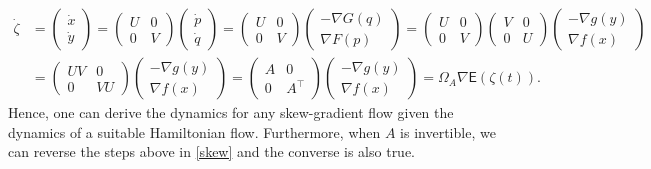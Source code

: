 \documentclass[11pt]{article}
\begin{document}
\begin{subequations}\label{skew}
\begin{align}
    \dot \zeta &=\begin{pmatrix} \dot x \\ \dot y \end{pmatrix}=\begin{pmatrix} U & 0 \\ 0 & V \end{pmatrix}\begin{pmatrix} \dot p \\ \dot q \end{pmatrix}=\begin{pmatrix} U & 0 \\ 0 & V \end{pmatrix}\begin{pmatrix} -\nabla G\left(q\right) \\ \nabla F\left(p\right) \end{pmatrix}=\begin{pmatrix} U & 0 \\ 0 & V \end{pmatrix}\begin{pmatrix} V & 0 \\ 0 & U \end{pmatrix}\begin{pmatrix} -\nabla g\left(y\right) \\ \nabla f\left(x\right) \end{pmatrix}\\
    &=\begin{pmatrix} UV & 0 \\ 0 & VU \end{pmatrix}\begin{pmatrix} -\nabla g\left(y\right) \\ \nabla f\left(x\right) \end{pmatrix}=\begin{pmatrix} A & 0 \\ 0 & A^{\top} \end{pmatrix}\begin{pmatrix} -\nabla g\left(y\right) \\ \nabla f\left(x\right) \end{pmatrix}=\Omega_{A}\nabla \mathsf{E}(\zeta(t)).
\end{align}
\end{subequations}
Hence, one can derive the dynamics for any skew-gradient flow given the dynamics of a suitable Hamiltonian flow. Furthermore, when $A$ is invertible, we can reverse the steps above in \eqref{skew} and the converse is also true. 
\end{document}
